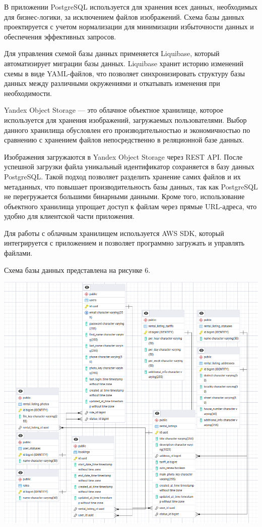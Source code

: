\documentclass[14pt]{extarticle}
\begin{document}
В приложении PostgreSQL используется для хранения всех данных,
необходимых для бизнес-логики, за исключением файлов изображений.
Схема базы данных проектируется с учетом нормализации
для минимизации избыточности данных и обеспечения эффективных запросов.

Для управления схемой базы данных применяется Liquibase,
который автоматизирует миграции базы данных.
Liquibase хранит историю изменений схемы в виде YAML-файлов,
что позволяет синхронизировать структуру
базы данных между различными окружениями
и откатывать изменения при необходимости.

Yandex Object Storage --- это облачное объектное хранилище,
которое используется для хранения изображений, загружаемых пользователями.
Выбор данного хранилища обусловлен его производительностью
и экономичностью по сравнению с хранением файлов непосредственно
в реляционной базе данных.

Изображения загружаются в Yandex Object Storage через REST API.
После успешной загрузки файла уникальный идентификатор сохраняется в базу данных PostgreSQL.
Такой подход позволяет разделить хранение самих файлов и их метаданных,
что повышает производительность базы данных, так как PostgreSQL
не перегружается большими бинарными данными.
Кроме того, использование объектного хранилища упрощает доступ к файлам
через прямые URL-адреса, что удобно для клиентской части приложения.

Для работы с облачным хранилищем используется AWS SDK,
который интегрируется с приложением и позволяет программно
загружать и управлять файлами.

Схема базы данных представлена на рисунке 6.

\begin{center}
    \includegraphics[width=1.0\textwidth]{erd.png}
\end{center}
\end{document}
